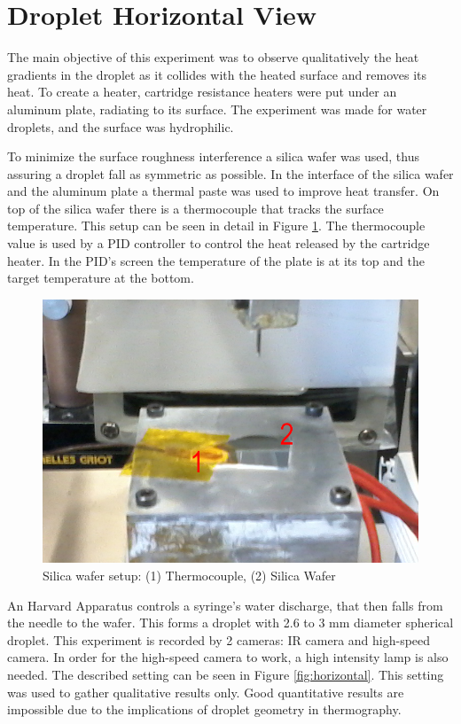 
\section{Droplet Horizontal View}

\par The main objective of this experiment was to observe qualitatively the heat gradients in the droplet as it collides with the heated surface and removes its heat. To create a heater, cartridge resistance heaters were put under an aluminum plate, radiating to its surface. The experiment was made for water droplets, and the surface was hydrophilic. \\

\par To minimize the surface roughness interference a silica wafer was used, thus assuring a droplet fall as symmetric as possible. In the interface of the silica wafer and the aluminum plate a thermal paste was used to improve heat transfer. On top of the silica wafer there is a thermocouple that tracks the surface temperature. This setup can be seen in detail in Figure \ref{fig:horizontal2}. The thermocouple value is used by a PID controller to control the heat released by the cartridge heater. In the PID's screen the temperature of the plate is at its top and the target temperature at the bottom.\\

\begin{figure}[h]
\centering
\includegraphics[width=0.5\linewidth]{Figures/3.Chapter/horizontal2.png}
\caption{Silica wafer setup: (1) Thermocouple, (2) Silica Wafer}
\label{fig:horizontal2}
\end{figure}

\par An Harvard Apparatus controls a syringe's water discharge, that then falls from the needle to the wafer. This forms a droplet with 2.6 to 3 mm diameter spherical droplet. This experiment is recorded by 2 cameras: IR camera and high-speed camera. In order for the high-speed camera to work, a high intensity lamp is also needed. The described setting can be seen in Figure \ref{fig:horizontal}. This setting was used to gather qualitative results only. Good quantitative results are impossible due to the implications of droplet geometry in thermography.

